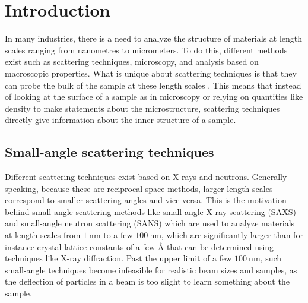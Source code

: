 \chapter{Introduction}
\label{chapter:introduction}
\label{c1:introduction}
In many industries, there is a need to analyze the structure of materials at length scales ranging from nanometres to micrometers. To do this, different methods exist such as scattering techniques, microscopy, and analysis based on macroscopic properties. What is unique about scattering techniques is that they can probe the bulk of the sample at these length scales \cite{bouwman2021}. This means that instead of looking at the surface of a sample as in microscopy or relying on quantities like density to make statements about the microstructure, scattering techniques directly give information about the inner structure of a sample. 

\section{Small-angle scattering techniques}
\label{c1.1}
Different scattering techniques exist based on X-rays and neutrons. Generally speaking, because these are reciprocal space methods, larger length scales correspond to smaller scattering angles and vice versa. This is the motivation behind small-angle scattering methods like small-angle X-ray scattering (SAXS) and small-angle neutron scattering (SANS) which are used to analyze materials at length scales from $\SI{1}{\nano\meter}$ to a few $\SI{100}{\nano\meter}$, which are significantly larger than for instance crystal lattice constants of a few $\unit{\angstrom}$ that can be determined using techniques like X-ray diffraction. Past the upper limit of a few $\SI{100}{\nano\meter}$, such small-angle techniques become infeasible for realistic beam sizes and samples, as the deflection of particles in a beam is too slight to learn something about the sample.
